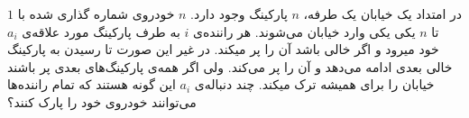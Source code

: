 \EXERCISE
در امتداد یک خیابان یک طرفه، 
$n$
 پارکینگ وجود دارد. 
$n$
خودروی شماره گذاری شده با 
$1$
 تا
$n$
یکی یکی وارد خیابان می‌شوند. هر راننده‌ی
$i$
 به طرف پارکینگ مورد علاقه‌ی
$a_i$
خود میرود و اگر خالی باشد آن را پر میکند. در غیر این صورت تا رسیدن به پارکینگ خالی بعدی ادامه می‌دهد و آن را پر می‌کند. ولی اگر همه‌ی پارکینگ‌های بعدی پر باشند خیابان را برای همیشه ترک میکند. چند دنباله‌ی
$a_i$
این گونه هستند که تمام راننده‌ها می‌توانند خودروی خود را پارک کنند؟